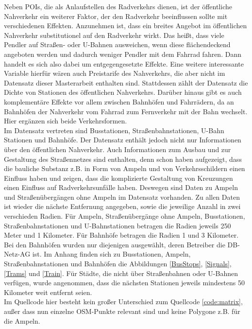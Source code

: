 \documentclass[a4paper,12pt]{thesis}
\begin{document}
Neben POIs, die als Anlaufstellen des Radverkehrs dienen, ist der öffentliche Nahverkehr ein weiterer Faktor, der den Radverkehr beeinflussen sollte mit verschiedenen Effekten. Anzunehmen ist, dass ein breites Angebot im öffentlichen Nahverkehr substitutionel auf den Radverkehr wirkt. Das heißt, dass viele Pendler auf Straßen- oder U-Bahnen ausweichen, wenn diese flächendeckend angeboten werden und dadurch weniger Pendler mit dem Fahrrad fahren. Dann handelt es sich also dabei um entgegengesetzte Effekte. Eine weitere interessante Variable hierfür wären auch Preistarife des Nahverkehrs, die aber nicht im Datensatz dieser Masterarbeit enthalten sind. Stattdessen zählt der Datensatz die Dichte von Stationen des öffentlichen Nahverkehrs. Darüber hinaus gibt es auch komplementäre Effekte vor allem zwischen Bahnhöfen und Fahrrädern, da an Bahnhöfen der Nahverkehr vom Fahrrad zum Fernverkehr mit der Bahn wechselt. Hier ergänzen sich beide Verkehrsformen.\\
Im Datensatz vertreten sind Busstationen, Straßenbahnstationen, U-Bahn Stationen und Bahnhöfe. Der Datensatz enthält jedoch nicht nur Informationen über den öffentlichen Nahverkehr. Auch Informationen zum Ausbau und zur Gestaltung des Straßennetzes sind enthalten, denn schon \cite{Heinen2010} haben aufgezeigt, dass die bauliche Substanz z.B. in Form von Ampeln und von Verkehrsschildern einen Einfluss haben und \cite{Vandenbulcke2014} zeigen, dass die komplizierte Gestaltung von Kreuzungen einen Einfluss auf Radverkehrsunfälle haben. Deswegen sind Daten zu Ampeln und Straßenübergängen ohne Ampeln im Datensatz vorhanden. Zu allen Daten ist wieder die nächste Entfernung angegeben, sowie die jeweilige Anzahl in zwei verschieden Radien. Für Ampeln, Straßenübergänge ohne Ampeln, Busstationen, Straßenbahnstationen und U-Bahnstationen betragen die Radien jeweils 250 Meter und 1 Kilometer. Für Bahnhöfe betragen die Radien 1 und 3 Kilometer. Bei den Bahnhöfen wurden nur diejenigen ausgewählt, deren Betreiber die DB-Netz-AG ist. Im Anhang finden sich zu Busstationen, Ampeln, Straßenbahnstationen und Bahnhöfen die Abbildungen \ref{BusStops}, \ref{Signals}, \ref{Trams} und \ref{Train}. Für Städte, die nicht über Straßenbahnen oder U-Bahnen verfügen, wurde angenommen, dass die nächsten Stationen jeweils mindestens 50 Kilometer weit entfernt seien.\\
Im Quellcode hier besteht kein großer Unterschied zum Quellcode \ref{code:matrix}, außer dass nun einzelne OSM-Punkte relevant sind und keine Polygone z.B. für die Ampeln.
\end{document}

